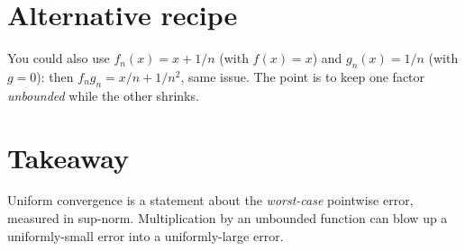 \documentclass[12pt]{article}
\begin{document}
\section*{Alternative recipe}
You could also use $f_n(x) = x + 1/n$ (with $f(x) = x$) and $g_n(x) = 1/n$ (with $g = 0$): then $f_n g_n = x/n + 1/n^2$, same issue. The point is to keep one factor \emph{unbounded} while the other shrinks.

\section*{Takeaway}
Uniform convergence is a statement about the \emph{worst-case} pointwise error, measured in sup-norm. Multiplication by an unbounded function can blow up a uniformly-small error into a uniformly-large error.
\end{document}
